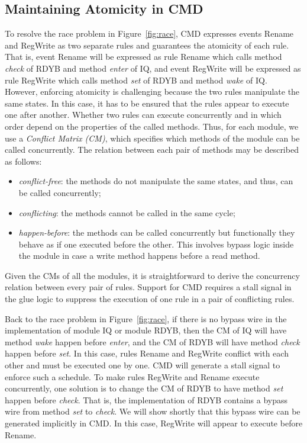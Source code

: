 \documentclass[conference]{IEEEtran}
\begin{document}
\subsection{Maintaining Atomicity in CMD}
To resolve the race problem in Figure~\ref{fig:race}, CMD expresses events Rename and RegWrite as two separate rules and guarantees the atomicity of each rule.
That is, event Rename will be expressed as rule Rename which calls method \emph{check} of RDYB and method \emph{enter} of IQ, and event RegWrite will be expressed as rule RegWrite which calls method \emph{set} of RDYB and method \emph{wake} of IQ.
However, enforcing atomicity is challenging because the two rules manipulate the same states.
In this case, it has to be ensured that the rules appear to execute one after another.
Whether two rules can execute concurrently and in which order depend on the properties of the called methods.
Thus, for each module, we use a \emph{Conflict Matrix (CM)}, which specifies which methods of the module can be called concurrently.
The relation between each pair of methods may be described as follows:
\begin{itemize}
    \item \emph{conflict-free}: the methods do not manipulate the same states, and thus, can be called concurrently;
    \item \emph{conflicting}: the methods cannot be called in the same cycle;
    \item \emph{happen-before}: the methods can be called concurrently but functionally they behave as if one executed before the other.
    This involves bypass logic inside the module in case a write method happens before a read method.
\end{itemize}
Given the CMs of all the modules, it is straightforward to derive the concurrency relation between every pair of rules.
Support for CMD requires a stall signal in the glue logic to suppress the execution of one rule in a pair of conflicting rules.

Back to the race problem in Figure~\ref{fig:race}, if there is no bypass wire in the implementation of module IQ or module RDYB, then the CM of IQ will have method \emph{wake} happen before \emph{enter}, and the CM of RDYB will have method \emph{check} happen before \emph{set}.
In this case, rules Rename and RegWrite conflict with each other and must be executed one by one. CMD will generate a stall signal to enforce such a schedule.
To make rules RegWrite and Rename execute concurrently, one solution is to change the CM of RDYB to have method \emph{set} happen before \emph{check}.
That is, the implementation of RDYB contains a bypass wire from method \emph{set} to \emph{check}.
We will show shortly that this bypass wire can be generated implicitly in CMD.
In this case, RegWrite will appear to execute before Rename.
\end{document}
